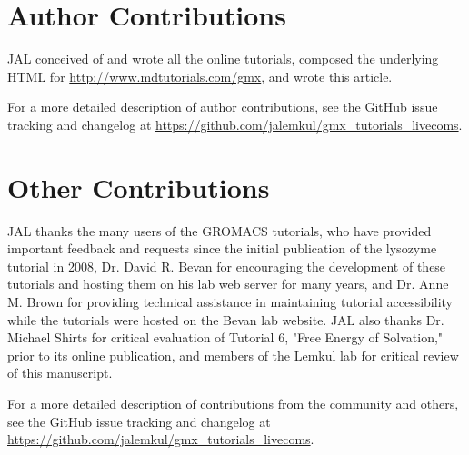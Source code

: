 \documentclass[9pt,tutorial,pubversion]{livecoms}
\newcommand{\githubrepository}{\url{https://github.com/jalemkul/gmx_tutorials_livecoms}}  %
\newcommand{\urlstring}{http://www.mdtutorials.com/gmx}
\newcommand{\tutorialhomeurl}{\url{\urlstring}}
\begin{document}
\section{Author Contributions}
%

JAL conceived of and wrote all the online tutorials, composed the underlying HTML for \tutorialhomeurl, and wrote this article.

For a more detailed description of author contributions,
see the GitHub issue tracking and changelog at \githubrepository.

\section{Other Contributions}
%

JAL thanks the many users of the GROMACS tutorials, who have provided important feedback and requests since the initial publication of the lysozyme tutorial in 2008, Dr. David R. Bevan for encouraging the development of these tutorials and hosting them on his lab web server for many years, and Dr. Anne M. Brown for providing technical assistance in maintaining tutorial accessibility while the tutorials were hosted on the Bevan lab website. JAL also thanks Dr. Michael Shirts for critical evaluation of Tutorial 6, "Free Energy of Solvation," prior to its online publication, and members of the Lemkul lab for critical review of this manuscript.

For a more detailed description of contributions from the community and others, see the GitHub issue tracking and changelog at \githubrepository.
\end{document}
